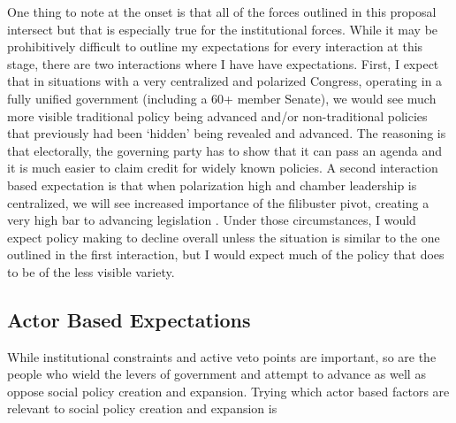 \documentclass[12pt]{article}
\begin{document}
One thing to note at the onset is that all of the forces outlined in this proposal intersect but that is especially true for the institutional forces. While it may be prohibitively difficult to outline my expectations for every interaction at this stage, there are two interactions where I have have expectations. First, I expect that in situations with a very centralized and polarized Congress, operating in a fully unified government (including a 60+ member Senate), we would see much more visible traditional policy being advanced and/or non-traditional policies that previously had been `hidden' being revealed and advanced. The reasoning is that electorally, the governing party has to show that it can pass an agenda and it is much easier to claim credit for widely known policies. A second interaction based expectation is that when polarization high and chamber leadership is centralized, we will see increased importance of the filibuster pivot, creating a very high bar to advancing legislation \citep{koger2010}. Under those circumstances, I would expect policy making to decline overall unless the situation is similar to the one outlined in the first interaction, but I would expect much of the policy that does to be of the less visible variety.


\subsection{Actor Based Expectations}
While institutional constraints and active veto points are important, so are the people who wield the levers of government and attempt to advance as well as oppose social policy creation and expansion. Trying which actor based factors are relevant to social policy creation and expansion is 


\citep{wawro2001}
\citep{evans2004}
\end{document}
